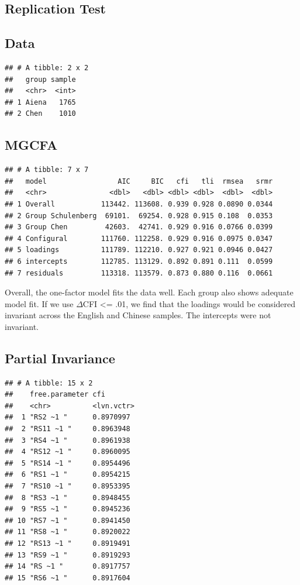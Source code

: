 \documentclass[
  man]{apa7}
\begin{document}
\subsection{Replication Test}\label{replication-test}

\subsection{Data}\label{data}

\begin{verbatim}
## # A tibble: 2 x 2
##   group sample
##   <chr>  <int>
## 1 Aiena   1765
## 2 Chen    1010
\end{verbatim}

\subsection{MGCFA}\label{mgcfa-1}

\begin{verbatim}
## # A tibble: 7 x 7
##   model                 AIC     BIC   cfi   tli  rmsea   srmr
##   <chr>               <dbl>   <dbl> <dbl> <dbl>  <dbl>  <dbl>
## 1 Overall           113442. 113608. 0.939 0.928 0.0890 0.0344
## 2 Group Schulenberg  69101.  69254. 0.928 0.915 0.108  0.0353
## 3 Group Chen         42603.  42741. 0.929 0.916 0.0766 0.0399
## 4 Configural        111760. 112258. 0.929 0.916 0.0975 0.0347
## 5 loadings          111789. 112210. 0.927 0.921 0.0946 0.0427
## 6 intercepts        112785. 113129. 0.892 0.891 0.111  0.0599
## 7 residuals         113318. 113579. 0.873 0.880 0.116  0.0661
\end{verbatim}

Overall, the one-factor model fits the data well. Each group also shows adequate model fit. If we use \(\Delta\)CFI \textless= .01, we find that the loadings would be considered invariant across the English and Chinese samples. The intercepts were not invariant.

\subsection{Partial Invariance}\label{partial-invariance-1}

\begin{verbatim}
## # A tibble: 15 x 2
##    free.parameter cfi       
##    <chr>          <lvn.vctr>
##  1 "RS2 ~1 "      0.8970997 
##  2 "RS11 ~1 "     0.8963948 
##  3 "RS4 ~1 "      0.8961938 
##  4 "RS12 ~1 "     0.8960095 
##  5 "RS14 ~1 "     0.8954496 
##  6 "RS1 ~1 "      0.8954215 
##  7 "RS10 ~1 "     0.8953395 
##  8 "RS3 ~1 "      0.8948455 
##  9 "RS5 ~1 "      0.8945236 
## 10 "RS7 ~1 "      0.8941450 
## 11 "RS8 ~1 "      0.8920022 
## 12 "RS13 ~1 "     0.8919491 
## 13 "RS9 ~1 "      0.8919293 
## 14 "RS ~1 "       0.8917757 
## 15 "RS6 ~1 "      0.8917604
\end{verbatim}
\end{document}
